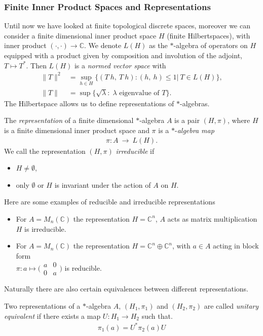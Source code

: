\subsubsection{Finite Inner Product Spaces and Representations}
Until now we have looked at finite topological discrete spaces, moreover we can consider a
finite dimensional inner product space $H$ (finite Hilbertspaces), with inner product
$(\cdot,\cdot)\rightarrow \mathbb{C}$. We denote $L(H)$ as the $*$-algebra of operators on $H$
equipped with a product given by composition and involution of the adjoint, $T \mapsto T^*$.
Then $L(H)$ is a \textit{normed vector space} with
\begin{align}
    \|T\|^2 &= \sup_{h \in H}\big\{(T\ h,\ T\ h): (h,\ h) \leq 1\big|\ T
    \in L(H)\big \},\\
    \|T\| &= \sup\big\{\sqrt{\lambda}:\; \lambda \text{ eigenvalue of } T\big\}.
\end{align}
The Hilbertspace allows us to define representations of $*$-algebras.
\begin{mydefinition}
    The \textit{representation} of a finite dimensional $*$-algebra $A$ is a
    pair $(H, \pi)$, where $H$ is a finite dimensional inner product space
    and $\pi$ is a $*$-\textit{algebra map}
    \begin{align}
        \pi:A\ \rightarrow \ L(H).
    \end{align}
    We call the representation $(H, \pi)$ \textit{irreducible} if
    \begin{itemize}
        \item $H \neq \emptyset$,
        \item only $\emptyset$ or $H$ is invariant under the action of $A$ on
            $H$.
    \end{itemize}
\end{mydefinition}
Here are some examples of reducible and irreducible representations
\begin{itemize}
    \item For $A = M_n(\mathbb{C})$ the representation $H=\mathbb{C}^n$, $A$ acts as matrix multiplication\\
            $H$ is irreducible.
    \item For $A = M_n(\mathbb{C})$ the representation $H=\mathbb{C}^n\oplus \mathbb{C}^n$, with $a \in A$ acting
        in block form \\ $\pi: a \mapsto \big(\begin{smallmatrix} a & 0\\ 0 & a \end{smallmatrix}\big)$ is
            reducible.
\end{itemize}
Naturally there are also certain equivalences between different
representations.
\begin{mydefinition}
Two representations of a $*$-algebra $A$, $(H_1, \pi _1)$ and
$(H_2, \pi _2)$  are called \textit{unitary equivalent} if there exists a map
$U: H_1 \rightarrow H_2$ such that.
    \begin{align}
        \pi _1(a) = U^* \pi _2(a) U
    \end{align}
\end{mydefinition}

